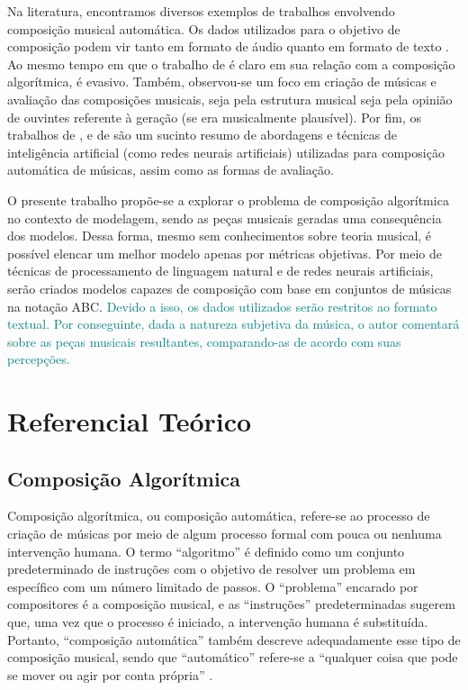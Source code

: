 \documentclass{automatextcc}
\newcommand{\nico}[1]{\textcolor{teal}{#1}}
\begin{document}
Na literatura, encontramos diversos exemplos de trabalhos envolvendo composição musical automática. Os dados utilizados para o objetivo de composição podem vir tanto em formato de áudio \citep[como o de][]{kuang2021} quanto em formato de texto \citep[como o de][]{agarwala2017}. Ao mesmo tempo em que o trabalho de \citet{colombo2016} é claro em sua relação com a composição algorítmica, \citet{souza2018} é evasivo. Também, observou-se um foco em criação de músicas e avaliação das composições musicais, seja pela estrutura musical seja pela opinião de ouvintes referente à geração (se era musicalmente plausível). Por fim, os trabalhos de \citet{fernandez2013}, \citet{ji2020} e de \citet{olivan2021} são um sucinto resumo de abordagens e técnicas de inteligência artificial (como redes neurais artificiais) utilizadas para composição automática de músicas, assim como as formas de avaliação. 

O presente trabalho propõe-se a explorar o problema de composição algorítmica no contexto de modelagem, sendo as peças musicais geradas uma consequência dos modelos. Dessa forma, mesmo sem conhecimentos sobre teoria musical, é possível elencar um melhor modelo apenas por métricas objetivas. Por meio de técnicas de processamento de linguagem natural e de redes neurais artificiais, serão criados modelos capazes de composição com base em conjuntos de músicas na notação ABC. \nico{Devido a isso, os dados utilizados serão restritos ao formato textual. Por conseguinte, dada a natureza subjetiva da música, o autor comentará sobre as peças musicais resultantes, comparando-as de acordo com suas percepções.}



\chapter{Referencial Teórico}

\section{Composição Algorítmica}
Composição algorítmica, ou composição automática, refere-se ao processo de criação de músicas por meio de algum processo formal com pouca ou nenhuma intervenção humana. O termo ``algoritmo'' é definido como um conjunto predeterminado de instruções com o objetivo de resolver um problema em específico com um número limitado de passos. O ``problema'' encarado por compositores é a composição musical, e as ``instruções'' predeterminadas sugerem que, uma vez que o processo é iniciado, a intervenção humana é substituída. Portanto, ``composição automática'' também descreve adequadamente esse tipo de composição musical, sendo que ``automático'' refere-se a ``qualquer coisa que pode se mover ou agir por conta própria'' \citep{alpern1995, maurer}.
\end{document}

